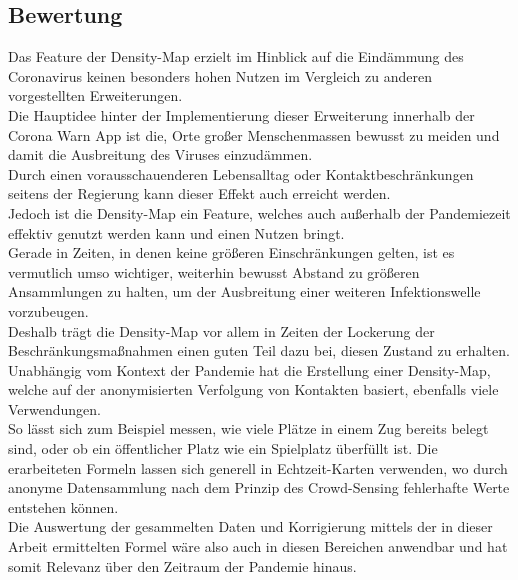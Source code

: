 \documentclass[conference,compsoc]{IEEEtran}
\begin{document}
\subsection{Bewertung}
Das Feature der Density-Map erzielt im Hinblick auf die Eindämmung des Coronavirus keinen besonders hohen Nutzen im Vergleich zu anderen vorgestellten Erweiterungen.\\
Die Hauptidee hinter der Implementierung dieser Erweiterung innerhalb der Corona Warn App ist die, Orte großer Menschenmassen bewusst zu meiden und damit die Ausbreitung des Viruses einzudämmen.\\
Durch einen vorausschauenderen Lebensalltag oder Kontaktbeschränkungen seitens der Regierung kann dieser Effekt auch erreicht werden.\\
Jedoch ist die Density-Map ein Feature, welches auch außerhalb der Pandemiezeit effektiv genutzt werden kann und einen Nutzen bringt.\\
Gerade in Zeiten, in denen keine größeren Einschränkungen gelten, ist es vermutlich umso wichtiger, weiterhin bewusst Abstand zu größeren Ansammlungen zu halten, um der Ausbreitung einer weiteren Infektionswelle vorzubeugen.\\
Deshalb trägt die Density-Map vor allem in Zeiten der Lockerung der Beschränkungsmaßnahmen einen guten Teil dazu bei, diesen Zustand zu erhalten.\\
Unabhängig vom Kontext der Pandemie hat die Erstellung einer Density-Map, welche auf der anonymisierten Verfolgung von Kontakten basiert, ebenfalls viele Verwendungen.\\
So lässt sich zum Beispiel messen, wie viele Plätze in einem Zug bereits belegt sind, oder ob ein öffentlicher Platz wie ein Spielplatz überfüllt ist. Die erarbeiteten Formeln lassen sich generell in Echtzeit-Karten verwenden,
wo durch anonyme Datensammlung nach dem Prinzip des Crowd-Sensing fehlerhafte Werte entstehen können.\\ 
Die Auswertung der gesammelten Daten und Korrigierung mittels der in dieser Arbeit ermittelten Formel wäre also auch in diesen Bereichen anwendbar und hat somit Relevanz über den Zeitraum der Pandemie hinaus.\\
\end{document}
